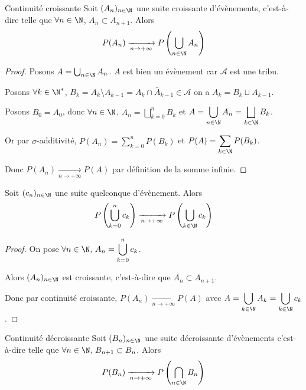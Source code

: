 \begin{theoreme}{Continuité croissante}{}
    Soit $(A_n)_{n \in \N}$ une suite croissante d'évènements, c'est-à-dire telle que $\forall n \in \N$, 
    $A_n \subset A_{n+1}$. Alors $$P(A_n) \xrightarrow[n \to + \infty]{} P\left( \bigcup_{n \in \N} A_n \right)$$
\end{theoreme}


\begin{proof}
    Posons $A = \bigcup_{n \in \N} A_n$. $A$ est bien un évènement car $\mathcal A$ est une tribu.

    Posons $\forall k \in \N^*$, $B_k = A_k \setminus A_{k-1} = A_k \cap \bar A_{k-1} \in \mathcal A$
    on a $A_k = B_k \sqcup A_{k - 1}$. 

    Posons $B_0 = A_0$, donc $\forall n \in \N$, $\displaystyle A_n = \bigsqcup_{k = 0}^n B_k$ 
    et $A = \displaystyle \bigcup_{n \in \N} A_n = \bigsqcup_{k \in \N} B_k$.

    Or par $\sigma$-additivité, $\displaystyle P(A_n) = \sum_{k = 0}^n P(B_k)$ et 
    $\displaystyle P(A) = \sum_{k \in \N} P(B_k)$.

    Donc $P(A_n) \xrightarrow[n \to + \infty]{} P(A)$ par définition de la somme infinie.
\end{proof}

\begin{proposition}{}{}
    Soit $(c_n)_{n \in \N}$ une suite quelconque d'évènement. Alors 
    $$P\left( \bigcup_{k = 0}^n c_k \right) \xrightarrow[n \to + \infty]{} P\left( \bigcup_{k \in \N} c_k \right)$$
\end{proposition}


\begin{proof}
    On pose $\forall n \in \N, \, \displaystyle A_n = \bigcup_{k = 0}^n c_k$. 

    Alors $(A_n)_{n \in \N}$ est croissante, c'est-à-dire que $A_n \subset A_{n + 1}$. 

    Donc par continuité croissante, $P(A_n) \xrightarrow[n \to + \infty]{} P(A)$
    avec $\displaystyle A = \bigcup_{k \in \N} A_k = \bigcup_{k \in \N} c_k$.
\end{proof}

\begin{theoreme}{Continuité décroissante}{}
    Soit $(B_n)_{n \in \N}$ une suite décroissante d'évènements c'est-à-dire telle que $\forall n \in \N, \, B_{n + 1} \subset B_n$.
    Alors $$\displaystyle P(B_n) \xrightarrow[n \to + \infty]{} P\left( \bigcap_{n \in \N} B_n \right)$$
\end{theoreme}

